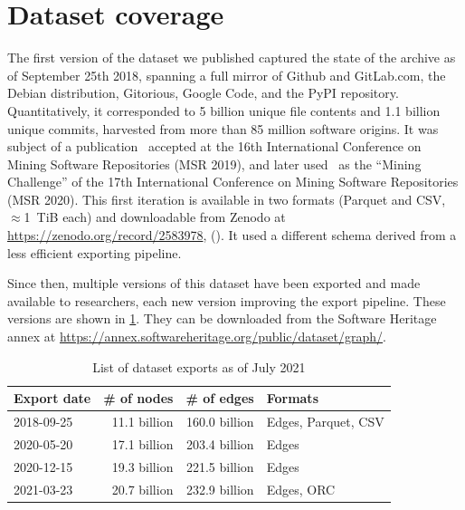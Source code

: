 \section{Dataset coverage}%
\label{sec:swh-dataset-coverage}

The first version of the dataset we published captured the state of the \SWH{}
archive as of September 25th 2018, spanning a full mirror of Github and
GitLab.com, the Debian distribution, Gitorious, Google Code, and the PyPI
repository. Quantitatively, it corresponded to 5 billion unique file contents
and 1.1 billion unique commits, harvested from more than 85 million software
origins. It was subject of a publication~\cite{swh-msr2019-dataset} accepted at the
16th International Conference on Mining Software Repositories (MSR 2019), and
later used~\cite{msr-2020-challenge} as the ``Mining Challenge'' of the 17th
International Conference on Mining Software Repositories (MSR 2020).
This first iteration is available in two formats (Parquet and CSV,
$\approx$1~TiB each) and downloadable from Zenodo at
\url{https://zenodo.org/record/2583978}, (). It
used a different schema derived from a less efficient exporting pipeline.

Since then, multiple versions of this dataset have been exported and made
available to researchers, each new version improving the export pipeline. These
versions are shown in \cref{tab:swh-dataset-exports}. They can be
downloaded from the Software Heritage annex at
\url{https://annex.softwareheritage.org/public/dataset/graph/}.

\begin{table}
  \centering
    \caption{List of dataset exports as of July 2021}%
    \label{tab:swh-dataset-exports}
    \begin{tabular}{l r r l}
        \hline\textbf{Export date} & \textbf{\# of nodes} & \textbf{\# of edges} & \textbf{Formats} \\ \hline

        2018-09-25 & 11.1 billion & 160.0 billion & Edges, Parquet, CSV \\ \hline
        2020-05-20 & 17.1 billion & 203.4 billion & Edges \\ \hline
        2020-12-15 & 19.3 billion & 221.5 billion & Edges \\ \hline
        2021-03-23 & 20.7 billion & 232.9 billion & Edges, ORC \\ \hline
    \end{tabular}
\end{table}

